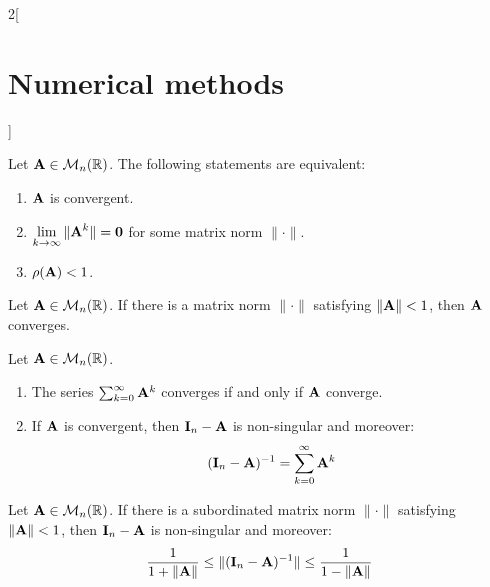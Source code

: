 \documentclass[../../../main.tex]{subfiles}
\begin{document}
\begin{multicols}{2}[\section{Numerical methods}]
\begin{theorem}
    Let $\vb{A}\in\mathcal{M}_n(\mathbb{R})$. The following statements are equivalent:
    \begin{enumerate}
        \item $\vb{A}$ is convergent.
        \item $\displaystyle\lim_{k\to\infty}\|\vb{A}^k\|=\vb{0}$ for some matrix norm $\|\cdot\|$.
        \item $\rho(\vb{A})<1$.
    \end{enumerate}
\end{theorem}
\begin{corollary}
    Let $\vb{A}\in\mathcal{M}_n(\mathbb{R})$. If there is a matrix norm $\|\cdot\|$ satisfying $\|\vb{A}\|<1$, then $\vb{A}$ converges.
\end{corollary}
\begin{theorem}
    Let $\vb{A}\in\mathcal{M}_n(\mathbb{R})$.
    \begin{enumerate}
        \item The series $\sum_{k=0}^\infty \vb{A}^k$ converges if and only if $\vb{A}$ converge.
        \item If $\vb{A}$ is convergent, then $\vb{I}_n-\vb{A}$ is non-singular and moreover: $$(\vb{I}_n-\vb{A})^{-1}=\sum_{k=0}^\infty\vb{A}^k$$
    \end{enumerate}
\end{theorem}
\begin{corollary}
    Let $\vb{A}\in\mathcal{M}_n(\mathbb{R})$. If there is a subordinated matrix norm $\|\cdot\|$ satisfying $\|\vb{A}\|<1$, then $\vb{I}_n-\vb{A}$ is non-singular and moreover: $$\frac{1}{1+\|\vb{A}\|}\leq\|(\vb{I}_n-\vb{A})^{-1}\|\leq\frac{1}{1-\|\vb{A}\|}$$
\end{corollary}

\end{multicols}
\end{document}

